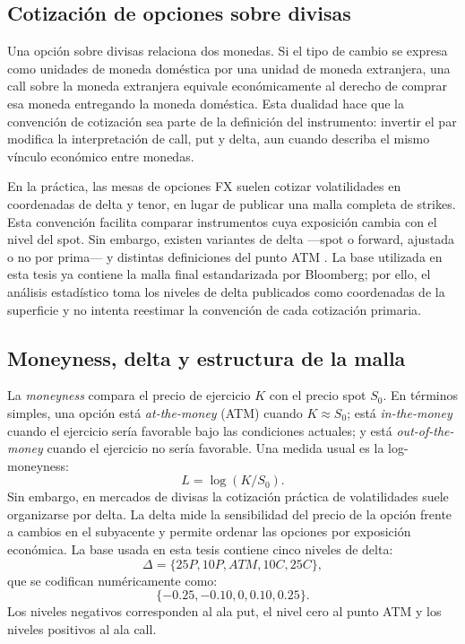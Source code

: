 \documentclass[a4paper,11pt]{article}
\begin{document}
\subsection{Cotización de opciones sobre divisas}

Una opción sobre divisas relaciona dos monedas. Si el tipo de cambio se expresa como unidades de moneda doméstica por una unidad de moneda extranjera, una call sobre la moneda extranjera equivale económicamente al derecho de comprar esa moneda entregando la moneda doméstica. Esta dualidad hace que la convención de cotización sea parte de la definición del instrumento: invertir el par modifica la interpretación de call, put y delta, aun cuando describa el mismo vínculo económico entre monedas.

En la práctica, las mesas de opciones FX suelen cotizar volatilidades en coordenadas de delta y tenor, en lugar de publicar una malla completa de strikes. Esta convención facilita comparar instrumentos cuya exposición cambia con el nivel del spot. Sin embargo, existen variantes de delta ---spot o forward, ajustada o no por prima--- y distintas definiciones del punto ATM \cite{ReiswichWystup2010}. La base utilizada en esta tesis ya contiene la malla final estandarizada por Bloomberg; por ello, el análisis estadístico toma los niveles de delta publicados como coordenadas de la superficie y no intenta reestimar la convención de cada cotización primaria.

\subsection{Moneyness, delta y estructura de la malla}

La \emph{moneyness} compara el precio de ejercicio \(K\) con el precio spot \(S_0\). En términos simples, una opción está \emph{at-the-money} (ATM) cuando \(K\approx S_0\); está \emph{in-the-money} cuando el ejercicio sería favorable bajo las condiciones actuales; y está \emph{out-of-the-money} cuando el ejercicio no sería favorable. Una medida usual es la log-moneyness:
\[
  L=\log(K/S_0).
\]
Sin embargo, en mercados de divisas la cotización práctica de volatilidades suele organizarse por delta. La delta mide la sensibilidad del precio de la opción frente a cambios en el subyacente y permite ordenar las opciones por exposición económica. La base usada en esta tesis contiene cinco niveles de delta:
\[
  \Delta=\{25P,10P,ATM,10C,25C\},
\]
que se codifican numéricamente como:
\[
  \{-0.25,-0.10,0,0.10,0.25\}.
\]
Los niveles negativos corresponden al ala put, el nivel cero al punto ATM y los niveles positivos al ala call.
\end{document}
